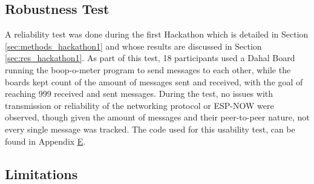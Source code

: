 \subsection{\label{sec:res_reliability}Robustness Test}
A reliability test was done during the first Hackathon which is detailed in Section \ref{sec:methods_hackathon1} and whose results are discussed in Section \ref{sec:res_hackathon1}. As part of this test, 18 participants used a Dahal Board running the boop-o-meter program to send messages to each other, while the boards kept count of the amount of messages sent and received, with the goal of reaching 999 received and sent messages. During the test, no issues with transmission or reliability of the networking protocol or ESP-NOW were observed, though given the amount of messages and their peer-to-peer nature, not every single message was tracked. The code used for this usability test, can be found in Appendix \hyperref[chap:apx_e]{E}.

\subsection{\label{sec:res_limitations}Limitations}

